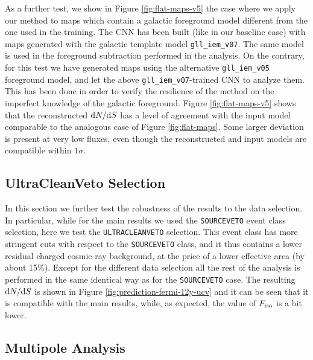 As a further test, we show in Figure \ref{fig:flat-maps-v5} the case where we apply our method to maps which contain a galactic foreground model different from the one used in the training. The CNN has been built (like in our baseline case) with maps generated with the galactic template model \verb|gll_iem_v07|. The same model is used in the foreground subtraction performed in the analysis. On the contrary, for this test we have generated maps  using the alternative \verb|gll_iem_v05| foreground model, and let the above \verb|gll_iem_v07|-trained CNN to analyze them. This has been done in order to verify the resilience of the method on the imperfect knowledge of the galactic foreground. Figure \ref{fig:flat-maps-v5} shows that the reconstructed $\text{d}N/\text{d}S$ has a level of agreement with the input model comparable to the analogous case of Figure \ref{fig:flat-maps}. Some larger deviation is present at very low fluxes, even though the reconstructed and input models are compatible within $1\sigma$.




\subsection{UltraCleanVeto Selection}


In this section we further test the robustness of the results to the \fermi data selection. In particular, while for the main results we used the \texttt{SOURCEVETO} event class selection, here we test the \texttt{ULTRACLEANVETO} selection. This event class has more stringent cuts with respect to the \texttt{SOURCEVETO} class, and it thus contains a lower residual charged  cosmic-ray background, at the price of a lower effective area (by about 15\%). Except for the different data selection all the rest of the analysis is performed in the same identical way as for the \texttt{SOURCEVETO} case. The resulting $\text{d}N/\text{d}S$ is shown in Figure \ref{fig:prediction-fermi-12y-ucv} and it can be seen that it is compatible with the main results, while, as expected, the value of $F_{\text{iso}}$ is a bit lower. 



\subsection{Multipole Analysis}



